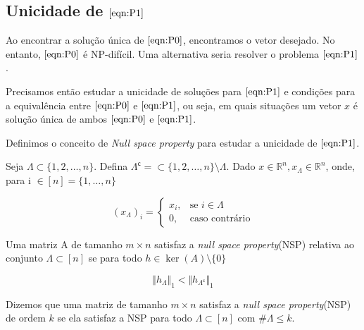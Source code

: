 \subsection{Unicidade de $\eqref{eqn:P1}$}

Ao encontrar a solução única de $\eqref{eqn:P0}$, encontramos o vetor desejado. No entanto, $\eqref{eqn:P0}$ é NP-difícil. Uma alternativa seria resolver o problema $\eqref{eqn:P1}$.

Precisamos então estudar a unicidade de soluções para $\eqref{eqn:P1}$ e condições para a equivalência entre $\eqref{eqn:P0}$ e $\eqref{eqn:P1}$, ou seja, em quais situações um vetor $x$ é solução única de ambos $\eqref{eqn:P0}$ e $\eqref{eqn:P1}$.

Definimos o conceito de \textit{Null space property} para estudar a unicidade de $\eqref{eqn:P1}$.

\begin{definicao} Seja $\Lambda \subset \lbrace 1, 2, \hdots, n \rbrace$. Defina $\Lambda^{\mathsf{c}} = \subset \lbrace 1, 2, \hdots, n \rbrace \setminus \Lambda$. Dado $x \in \mathbb{R}^n, x_{\Lambda} \in \mathbb{R}^n$, onde, para i $\in [n] = \{1, \hdots, n\}$

$$(x_{\Lambda})_i = 
\begin{cases}
x_i, &\mbox{se } i \in \Lambda \\
0,   &\mbox{caso contrário}
\end{cases}$$

\end{definicao}

\begin{definicao} Uma matriz A de tamanho $m \times n$ satisfaz a \textit{null space property}(NSP) relativa ao conjunto $\Lambda \subset [n]$ se para todo $h \in \ker(A) \setminus \lbrace 0 \rbrace$


$$ \Vert h_{\Lambda} \Vert_1 <  \Vert h_{\Lambda^{\mathsf{c}}} \Vert_1$$
\end{definicao}

\begin{definicao}
Dizemos que uma matriz de tamanho $m \times n$ satisfaz a \textit{null space property}(NSP) de ordem $k$ se ela satisfaz a NSP para todo $\Lambda \subset [n]$ com $\# \Lambda \leq k$.
\end{definicao}

